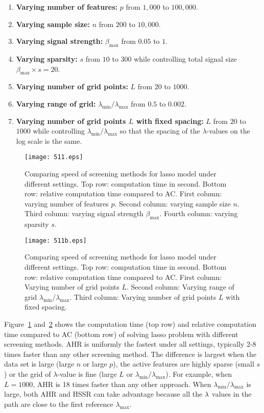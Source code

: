 \begin{enumerate}
    \item \textbf{Varying number of features:} $p$ from $1,000$ to $100,000$.
    \item \textbf{Varying sample size:} $n$ from $200$ to $10,000$.
    \item \textbf{Varying signal strength:} $\beta_{\max}$ from $0.05$ to $1$.
    \item \textbf{Varying sparsity:} $s$ from $10$ to $300$ while controlling total signal size $\beta_{\max}\times s=20$.
    \item \textbf{Varying number of grid points:}  $L$ from $20$ to $1000$.
    \item \textbf{Varying range of grid:}  $\lambda_{\min}/\lambda_{\max}$ from $0.5$ to $0.002$.
    \item \textbf{Varying number of grid points $L$ with fixed spacing:} $L$ from $20$ to $1000$ while controlling $\lambda_{\min}/\lambda_{\max}$ so that the spacing of the $\lambda$-values on the log scale is the same.
\end{enumerate}

\begin{figure}[ht]
    \centering
    \texttt{[image: 511.eps]}    \caption{Comparing speed of screening methods for lasso model under different settings. Top row: computation time in second. Bottom row: relative computation time compared to AC. First column: varying number of features $p$. Second column: varying sample size $n$. Third column: varying signal strength $\beta_{\max}$. Fourth column: varying sparsity $s$.}
    \label{fig:5.1.1a}
\end{figure}

\begin{figure}[ht]
    \centering
    \texttt{[image: 511b.eps]}    \caption{Comparing speed of screening methods for lasso model under different settings. Top row: computation time in second. Bottom row: relative computation time compared to AC. First column: Varying number of grid points $L$. Second column: Varying range of grid $\lambda_{\min}/\lambda_{\max}$. Third column: Varying number of grid points $L$ with fixed spacing.}
    \label{fig:5.1.1b}
\end{figure}

Figure~\ref{fig:5.1.1a} and~\ref{fig:5.1.1b} shows the computation time (top row) and relative computation time compared to AC (bottom row) of solving lasso problem with different screening methods. AHR is uniformly the fastest under all settings, typically 2-8 times faster than any other screening method. The difference is largest when the data set is large (large $n$ or large $p$), the active features are highly sparse (small $s$) or the grid of $\lambda$-value is fine (large $L$ or $\lambda_{\min}/\lambda_{\max}$). For example, when $L=1000$, AHR is 18 times faster than any other approach. When $\lambda_{\min}/\lambda_{\max}$ is large, both AHR and HSSR can take advantage because all the $\lambda$ values in the path are close to the first reference $\lambda_{\max}$.

